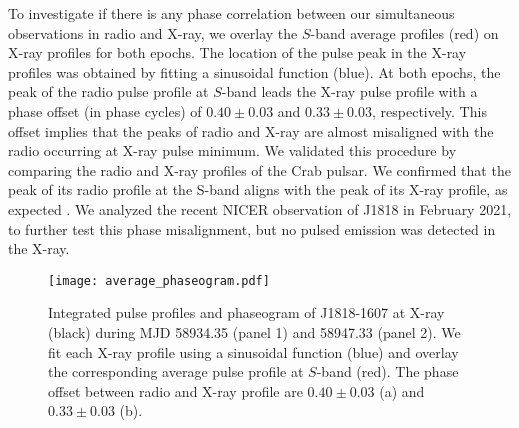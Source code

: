 \documentclass[twocolumn]{emulateapj}
\begin{document}
To investigate if there is any phase correlation between our simultaneous observations in radio and X-ray, we overlay the $S$-band average profiles (red) on X-ray profiles for both epochs. The location of the pulse peak in the X-ray profiles was obtained by fitting a sinusoidal function (blue). At both epochs, the peak of the radio pulse profile at $S$-band leads the X-ray pulse profile with a phase offset (in phase cycles) of $0.40 \pm 0.03 $ and $0.33 \pm 0.03$, respectively. This offset implies that the peaks of radio and X-ray are almost misaligned with the radio occurring at X-ray pulse minimum. We validated this procedure by comparing the radio and X-ray profiles of the Crab pulsar. We confirmed that the peak of its radio profile at the S-band aligns with the peak of its X-ray profile, as expected \citep{hankins2007}. We analyzed the recent NICER observation of J1818 in February 2021, to further test this phase misalignment, but no pulsed emission was detected in the X-ray.



\begin{figure*}[b]
	\centering
	\texttt{[image: average\_phaseogram.pdf]}
	\caption{ Integrated pulse profiles and phaseogram of J1818-1607 at X-ray (black) during MJD 58934.35 (panel 1) and 58947.33 (panel 2). We fit each X-ray profile using a sinusoidal function (blue) and overlay the corresponding average pulse profile at $S$-band (red). The phase offset between radio and X-ray profile are $0.40 \pm 0.03 $ (a) and $0.33 \pm 0.03$ (b).}%
\end{figure*}
\end{document}
